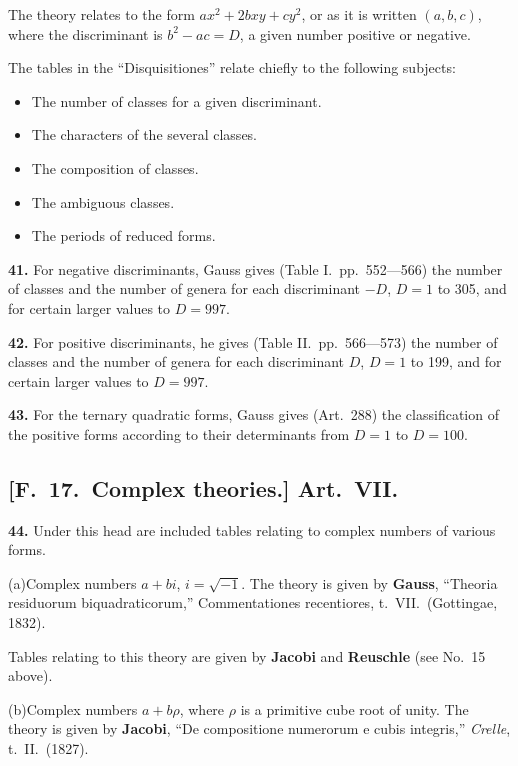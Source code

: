 \documentclass[11pt,a4paper]{book}
\begin{document}
The theory relates to the form $ax^{2} + 2bxy + cy^{2}$, or as it is written $(a, b, c)$,
where the discriminant is $b^{2} - ac = D$, a given number positive or negative.

The tables in the ``Disquisitiones'' relate chiefly to the following subjects:
\begin{itemize}
\item The number of classes for a given discriminant.
\item The characters of the several classes.
\item The composition of classes.
\item The ambiguous classes.
\item The periods of reduced forms.
\end{itemize}

\textbf{41.} For negative discriminants, Gauss gives (Table I.\ pp.\ 552---566) the number of
classes and the number of genera for each discriminant $-D$, $D = 1$ to 305, and for
certain larger values to $D = 997$.

\textbf{42.} For positive discriminants, he gives (Table II.\ pp.\ 566---573) the number of
classes and the number of genera for each discriminant $D$, $D = 1$ to 199, and for
certain larger values to $D = 997$.

\textbf{43.} For the ternary quadratic forms, Gauss gives (Art.\ 288) the classification of
the positive forms according to their determinants from $D = 1$ to $D = 100$.

\newpage
\subsection*{[F.\ 17.\ Complex theories.] Art.\ VII.}

\textbf{44.} Under this head are included tables relating to complex numbers of various forms.

\quad(a)\quad Complex numbers $a + bi$, $i = \sqrt{-1}$.
The theory is given by
\quad\textbf{Gauss}, ``Theoria residuorum biquadraticorum,'' Commentationes recentiores,
t.\ VII.\ (Gottingae, 1832).

Tables relating to this theory are given by
\quad\textbf{Jacobi} and \textbf{Reuschle} (see No.\ 15 above).

\quad(b)\quad Complex numbers $a + b\rho$, where $\rho$ is a primitive cube root of unity.
The theory is given by
\quad\textbf{Jacobi}, ``De compositione numerorum e cubis integris,'' \textit{Crelle}, t.\ II.\ (1827).
\end{document}
